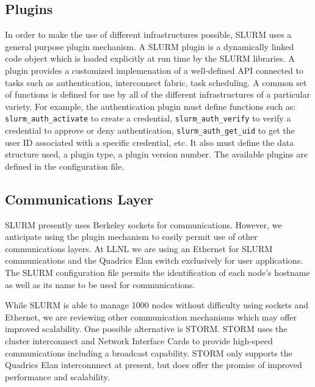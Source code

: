 \subsection{Plugins}

In order to make the use of different infrastructures possible, 
SLURM uses a general purpose plugin mechanism. 
A SLURM plugin is a dynamically linked code object which is 
loaded explicitly at run time by the SLURM libraries. 
A plugin provides a customized implemenation of a well-defined
API connected to tasks such as authentication, interconnect fabric, 
task scheduling.
A common set of functions is defined for use by all of the different 
infrastructures of a particular variety. 
For example, the authentication plugin must define functions 
such as: 
{\tt slurm\_auth\_activate} to create a credential,
{\tt slurm\_auth\_verify} to verify a credential to 
approve or deny authentication, 
{\tt slurm\_auth\_get\_uid} to get the user ID associated with 
a specific credential, etc.
It also must define the data structure used, a plugin type, 
a plugin version number.
The available plugins are defined in the configuration file.

\subsection{Communications Layer}

SLURM presently uses Berkeley sockets for communications. 
However, we anticipate using the plugin mechanism to easily 
permit use of other communications layers. 
At LLNL we are using an Ethernet for SLURM communications and 
the Quadrics Elan switch exclusively for user applications. 
The SLURM configuration file permits the identification of each 
node's hostname as well as its name to be used for communications. 

While SLURM is able to manage 1000 nodes without difficulty using 
sockets and Ethernet, we are reviewing other communication 
mechanisms which may offer improved scalability. 
One possible alternative is STORM\cite{STORM01}. 
STORM uses the cluster interconnect and Network Interface Cards to 
provide high-speed communications including a broadcast capability. 
STORM only supports the Quadrics Elan interconnnect at present, 
but does offer the promise of improved performance and scalability. 

